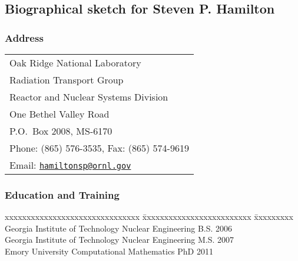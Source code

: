 
\subsection{Biographical sketch for Steven P. Hamilton}

\subsubsection*{Address}
\begin{tabular}{l}
  Oak Ridge National Laboratory \\
  Radiation Transport Group\\
  Reactor and Nuclear Systems Division\\
  One Bethel Valley Road\\
  P.O.~Box 2008, MS-6170\\
  Phone:  (865) 576-3535, Fax:    (865) 574-9619	\\
  Email:  \href{mailto:hamiltonsp@ornl.gov}{\texttt{hamiltonsp@ornl.gov}}
\end{tabular}


\vspace*{-1ex}
\subsubsection*{Education and Training}
\vspace*{-1ex}
\begin{tabbing}
  \hspace*{1ex} 
  xxxxxxxxxxxxxxxxxxxxxxxxxxxxxxx \= xxxxxxxxxxxxxxxxxxxxxxxxx \= xxxxxxxxx \kill
  Georgia Institute of Technology \> Nuclear Engineering       \> B.S. 2006 \\
  Georgia Institute of Technology \> Nuclear Engineering       \> M.S. 2007 \\
  Emory University                \> Computational Mathematics \> PhD  2011
\end{tabbing}


\vspace*{-3ex}
